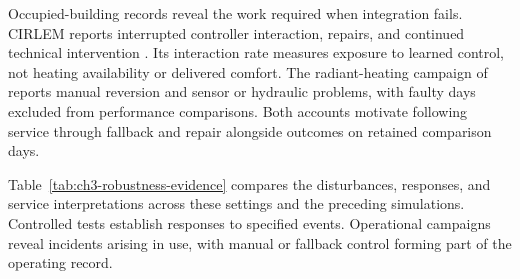Occupied-building records reveal the work required when integration fails. CIRLEM reports interrupted controller interaction, repairs, and continued technical intervention \parencite{hosseini2026cirlem}. Its interaction rate measures exposure to learned control, not heating availability or delivered comfort. The radiant-heating campaign of \textcite{wang2026buildingmarl} reports manual reversion and sensor or hydraulic problems, with faulty days excluded from performance comparisons. Both accounts motivate following service through fallback and repair alongside outcomes on retained comparison days.

Table~\ref{tab:ch3-robustness-evidence} compares the disturbances, responses, and service interpretations across these settings and the preceding simulations. Controlled tests establish responses to specified events. Operational campaigns reveal incidents arising in use, with manual or fallback control forming part of the operating record.

